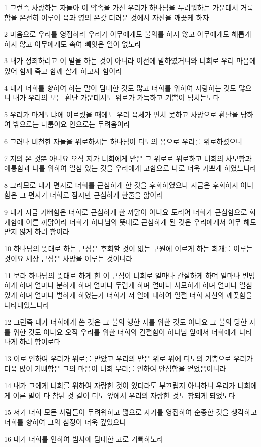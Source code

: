 \par 1 그런즉 사랑하는 자들아 이 약속을 가진 우리가 하나님을 두려워하는 가운데서 거룩함을 온전히 이루어 육과 영의 온갖 더러운 것에서 자신을 깨끗케 하자
\par 2 마음으로 우리를 영접하라 우리가 아무에게도 불의를 하지 않고 아무에게도 해롭게 하지 않고 아무에게도 속여 빼앗은 일이 없노라
\par 3 내가 정죄하려고 이 말을 하는 것이 아니라 이전에 말하였거니와 너희로 우리 마음에 있어 함께 죽고 함께 살게 하고자 함이라
\par 4 내가 너희를 향하여 하는 말이 담대한 것도 많고 너희를 위하여 자랑하는 것도 많으니 내가 우리의 모든 환난 가운데서도 위로가 가득하고 기쁨이 넘치는도다
\par 5 우리가 마게도냐에 이르렀을 때에도 우리 육체가 편치 못하고 사방으로 환난을 당하여 밖으로는 다툼이요 안으로는 두려움이라
\par 6 그러나 비천한 자들을 위로하시는 하나님이 디도의 옴으로 우리를 위로하셨으니
\par 7 저의 온 것뿐 아니요 오직 저가 너희에게 받은 그 위로로 위로하고 너희의 사모함과 애통함과 나를 위하여 열심 있는 것을 우리에게 고함으로 나로 더욱 기쁘게 하였느니라
\par 8 그러므로 내가 편지로 너희를 근심하게 한 것을 후회하였으나 지금은 후회하지 아니함은 그 편지가 너희로 잠시만 근심하게 한줄을 앎이라
\par 9 내가 지금 기뻐함은 너희로 근심하게 한 까닭이 아니요 도리어 너희가 근심함으로 회개함에 이른 까닭이라 너희가 하나님의 뜻대로 근심하게 된 것은 우리에게서 아무 해도 받지 않게 하려 함이라
\par 10 하나님의 뜻대로 하는 근심은 후회할 것이 없는 구원에 이르게 하는 회개를 이루는 것이요 세상 근심은 사망을 이루는 것이니라
\par 11 보라 하나님의 뜻대로 하게 한 이 근심이 너희로 얼마나 간절하게 하며 얼마나 변명하게 하며 얼마나 분하게 하며 얼마나 두렵게 하며 얼마나 사모하게 하며 얼마나 열심있게 하며 얼마나 벌하게 하였는가 너희가 저 일에 대하여 일절 너희 자신의 깨끗함을 나타내었느니라
\par 12 그런즉 내가 너희에게 쓴 것은 그 불의 행한 자를 위한 것도 아니요 그 불의 당한 자를 위한 것도 아니요 오직 우리를 위한 너희의 간절함이 하나님 앞에서 너희에게 나타나게 하려 함이로다
\par 13 이로 인하여 우리가 위로를 받았고 우리의 받은 위로 위에 디도의 기쁨으로 우리가 더욱 많이 기뻐함은 그의 마음이 너희 무리를 인하여 안심함을 얻었음이니라
\par 14 내가 그에게 너희를 위하여 자랑한 것이 있더라도 부끄럽지 아니하니 우리가 너희에게 이른 말이 다 참된 것 같이 디도 앞에서 우리의 자랑한 것도 참되게 되었도다
\par 15 저가 너희 모든 사람들이 두려워하고 떪으로 자기를 영접하여 순종한 것을 생각하고 너희를 향하여 그의 심정이 더욱 깊었으니
\par 16 내가 너희를 인하여 범사에 담대한 고로 기뻐하노라

